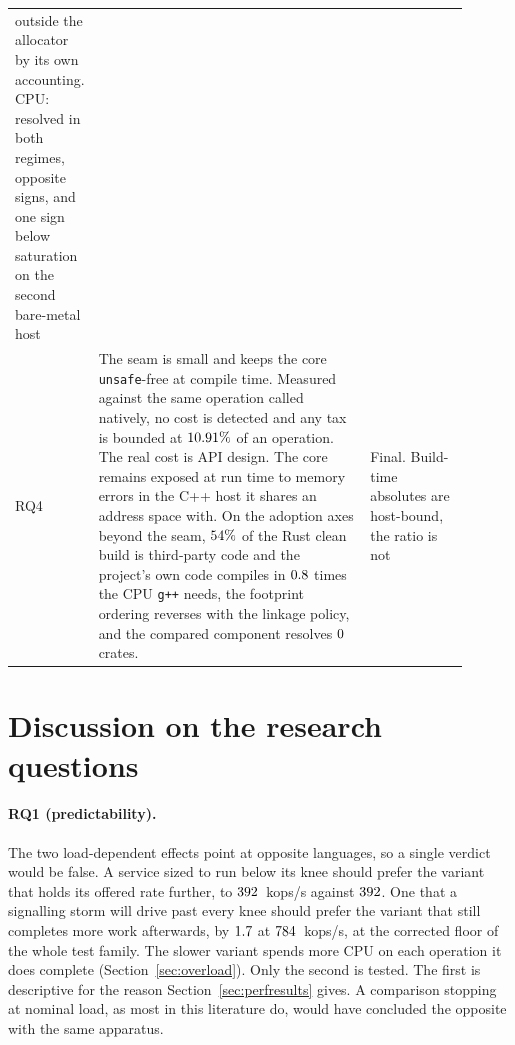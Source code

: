 \documentclass[english,oneside,a4paper,censored,csm,software-track-2020]{HYthesisML}
\begin{document}
\begin{table}[tp]
\begin{tabular}{@{}p{0.06\linewidth} p{0.62\linewidth} p{0.22\linewidth}@{}}
outside the allocator by its own accounting. CPU: resolved in both regimes, opposite signs, and
one sign below saturation on the second bare-metal host \\
RQ4 & The seam is small and keeps the core \texttt{unsafe}-free at compile time. Measured against
the same operation called natively, no cost is detected and any tax is bounded at
$10.91\%$ of an operation. The real cost is API design. The core remains exposed at run
time to memory errors in the C++ host it shares an address space with. On the adoption axes beyond
the seam, $54\%$ of the Rust clean build is third-party code and the project's own
code compiles in $0.8$ times the CPU \texttt{g++} needs, the footprint
ordering reverses with the linkage policy, and the compared component resolves $0$ crates.
& Final. Build-time absolutes are host-bound, the ratio is not \\
\hline
\end{tabular}
\end{table}

\section{Discussion on the research questions}\label{sec:rqdiscussion}
\paragraph{RQ1 (predictability).} The two load-dependent effects point at opposite languages, so a
single verdict would be false. A service sized to run below its knee should prefer the variant that
holds its offered rate further, to $392$~kops/s against $392$. One that a signalling storm will drive past every knee should prefer the variant that still
completes more work afterwards, by $1.7$ at $784$~kops/s, at the
corrected floor of the whole test family. The slower variant spends more CPU on each operation it
does complete (Section~\ref{sec:overload}). Only the second is tested. The first is descriptive for the reason
Section~\ref{sec:perfresults} gives. A comparison stopping at nominal load, as most in this
literature do, would have concluded the opposite with the same apparatus.
\end{document}
